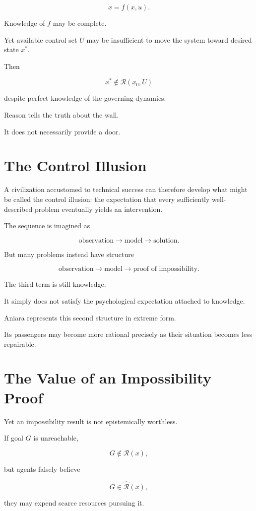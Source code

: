 \documentclass[11pt,oneside]{book}
\theoremstyle{definition}
\theoremstyle{remark}
\newcommand{\R}{\mathcal{R}}
\begin{document}
\[
\dot{x}=f(x,u).
\]

Knowledge of \(f\) may be complete.

Yet available control set \(U\) may be insufficient to move the system toward desired state \(x^\ast\).

Then

\[
x^\ast\notin\R(x_0,U)
\]

despite perfect knowledge of the governing dynamics.

Reason tells the truth about the wall.

It does not necessarily provide a door.

\section{The Control Illusion}

A civilization accustomed to technical success can therefore develop what might be called the control illusion: the expectation that every sufficiently well-described problem eventually yields an intervention.

The sequence is imagined as

\[
\text{observation}
\rightarrow
\text{model}
\rightarrow
\text{solution}.
\]

But many problems instead have structure

\[
\text{observation}
\rightarrow
\text{model}
\rightarrow
\text{proof of impossibility}.
\]

The third term is still knowledge.

It simply does not satisfy the psychological expectation attached to knowledge.

Aniara represents this second structure in extreme form.

Its passengers may become more rational precisely as their situation becomes less repairable.

\section{The Value of an Impossibility Proof}

Yet an impossibility result is not epistemically worthless.

If goal \(G\) is unreachable,

\[
G\notin\R(x),
\]

but agents falsely believe

\[
G\in\widehat{\R}(x),
\]

they may expend scarce resources pursuing it.
\end{document}
